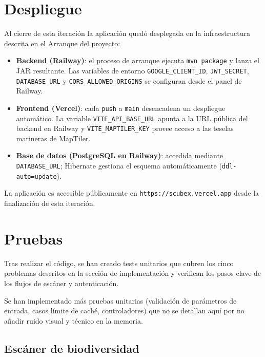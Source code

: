 \clearpage
\section{Despliegue}

Al cierre de esta iteración la aplicación quedó desplegada en la infraestructura descrita en el Arranque del proyecto:

\begin{itemize}
    \item \textbf{Backend (Railway)}: el proceso de arranque ejecuta \texttt{mvn package} y lanza el JAR resultante. Las variables de entorno \texttt{GOOGLE\_CLIENT\_ID}, \texttt{JWT\_SECRET}, \texttt{DATABASE\_URL} y \texttt{CORS\_ALLOWED\_ORIGINS} se configuran desde el panel de Railway.
    \item \textbf{Frontend (Vercel)}: cada \texttt{push} a \texttt{main} desencadena un despliegue automático. La variable \texttt{VITE\_API\_BASE\_URL} apunta a la URL pública del backend en Railway y \texttt{VITE\_MAPTILER\_KEY} provee acceso a las teselas marineras de MapTiler.
    \item \textbf{Base de datos (PostgreSQL en Railway)}: accedida mediante \texttt{DATABASE\_URL}; Hibernate gestiona el esquema automáticamente (\texttt{ddl-auto=update}).
\end{itemize}

La aplicación es accesible públicamente en \texttt{https://scubex.vercel.app} desde la finalización de esta iteración.

\section{Pruebas}

Tras realizar el código, se han creado tests unitarios que cubren los cinco problemas descritos en la sección de implementación y verifican los pasos clave de los flujos de escáner y autenticación. 

Se han implementado más pruebas unitarias (validación de parámetros de entrada, casos
límite de caché, controladores) que no se detallan aquí por no añadir ruido visual y técnico en la memoria.

\subsection*{Escáner de biodiversidad}

